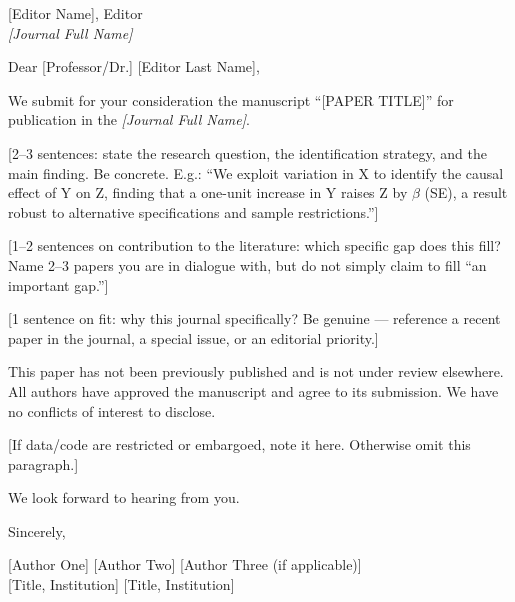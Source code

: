 \documentclass[12pt]{letter}
\date{\today}
\begin{document}
\begin{letter}{%
  [Editor Name], Editor \\
  \textit{[Journal Full Name]}
}

\opening{Dear [Professor/Dr.] [Editor Last Name],}

We submit for your consideration the manuscript ``[PAPER TITLE]'' for publication in the
\textit{[Journal Full Name]}.

[2--3 sentences: state the research question, the identification strategy, and the main finding.
Be concrete. E.g.: ``We exploit variation in X to identify the causal effect of Y on Z,
finding that a one-unit increase in Y raises Z by $\beta$ (SE), a result robust to
alternative specifications and sample restrictions.'']

[1--2 sentences on contribution to the literature: which specific gap does this fill?
Name 2--3 papers you are in dialogue with, but do not simply claim to fill ``an important gap.'']

[1 sentence on fit: why this journal specifically? Be genuine --- reference a recent paper
in the journal, a special issue, or an editorial priority.]

This paper has not been previously published and is not under review elsewhere. All authors
have approved the manuscript and agree to its submission. We have no conflicts of interest
to disclose.

[If data/code are restricted or embargoed, note it here. Otherwise omit this paragraph.]

We look forward to hearing from you.

\closing{Sincerely,}

\vspace{1cm}
[Author One] \hfill [Author Two] \hfill [Author Three (if applicable)]\\
[Title, Institution] \hfill [Title, Institution] \hfill [Title, Institution]

\end{letter}
\end{document}
